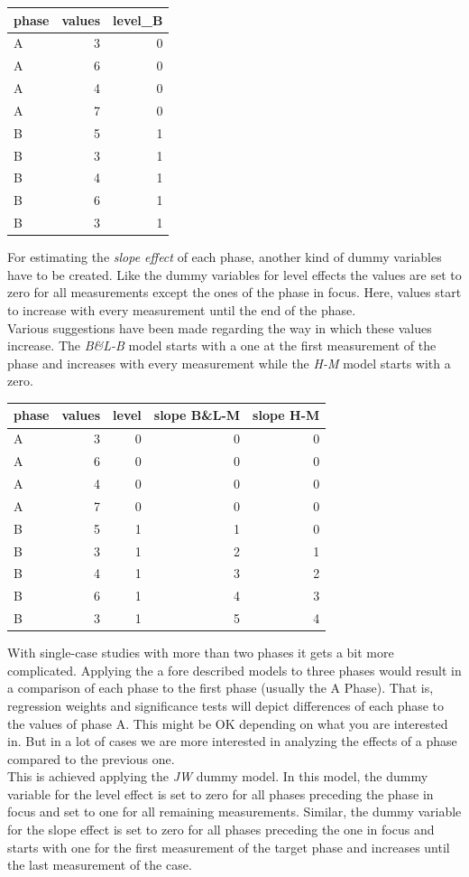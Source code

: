 \documentclass[
]{book}
\begin{document}
\begin{tabular}{l|r|r}
\hline
phase & values & level\_B\\
\hline
A & 3 & 0\\
\hline
A & 6 & 0\\
\hline
A & 4 & 0\\
\hline
A & 7 & 0\\
\hline
B & 5 & 1\\
\hline
B & 3 & 1\\
\hline
B & 4 & 1\\
\hline
B & 6 & 1\\
\hline
B & 3 & 1\\
\hline
\end{tabular}

For estimating the \emph{slope effect} of each phase, another kind of dummy variables have to be created. Like the dummy variables for level effects the values are set to zero for all measurements except the ones of the phase in focus. Here, values start to increase with every measurement until the end of the phase.\\
Various suggestions have been made regarding the way in which these values increase. The \emph{B\&L-B} model starts with a one at the first measurement of the phase and increases with every measurement while the \emph{H-M} model starts with a zero.

\begin{tabular}{l|r|r|r|r}
\hline
phase & values & level & slope B\&L-M & slope H-M\\
\hline
A & 3 & 0 & 0 & 0\\
\hline
A & 6 & 0 & 0 & 0\\
\hline
A & 4 & 0 & 0 & 0\\
\hline
A & 7 & 0 & 0 & 0\\
\hline
B & 5 & 1 & 1 & 0\\
\hline
B & 3 & 1 & 2 & 1\\
\hline
B & 4 & 1 & 3 & 2\\
\hline
B & 6 & 1 & 4 & 3\\
\hline
B & 3 & 1 & 5 & 4\\
\hline
\end{tabular}

With single-case studies with more than two phases it gets a bit more complicated. Applying the a fore described models to three phases would result in a comparison of each phase to the first phase (usually the A Phase). That is, regression weights and significance tests will depict differences of each phase to the values of phase A. This might be OK depending on what you are interested in. But in a lot of cases we are more interested in analyzing the effects of a phase compared to the previous one.\\
This is achieved applying the \emph{JW} dummy model. In this model, the dummy variable for the level effect is set to zero for all phases preceding the phase in focus and set to one for all remaining measurements. Similar, the dummy variable for the slope effect is set to zero for all phases preceding the one in focus and starts with one for the first measurement of the target phase and increases until the last measurement of the case.
\end{document}
